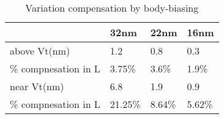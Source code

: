 \begin{table}
  \caption {Variation compensation by body-biasing}  
  \centering
  \label {compensation}
  \begin{tabular}{ | l | l | l | l | }
    \hline
    & 32nm & 22nm & 16nm \\ \hline
    above Vt(nm) & 1.2 & 0.8 & 0.3 \\ \hline
    \% compnesation in L  & 3.75\% & 3.6\% & 1.9\% \\ \hline
    near Vt(nm)  & 6.8 & 1.9 & 0.9\\  \hline
    \% compnesation in L & 21.25\% & 8.64\% & 5.62\% \\ 
    \hline
  \end{tabular}
\end{table}

